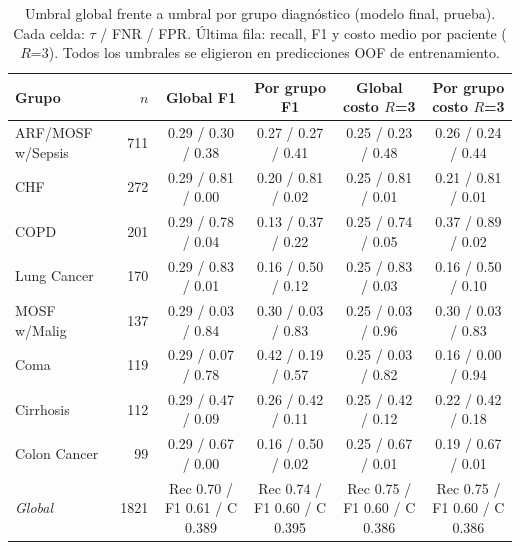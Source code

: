 \begin{table}[!tp]
\centering
\scriptsize
\caption{Umbral global frente a umbral por grupo diagnóstico (modelo final, prueba). Cada celda: $\tau$ / FNR / FPR. Última fila: recall, F1 y costo medio por paciente ($R$=3). Todos los umbrales se eligieron en predicciones OOF de entrenamiento.}
\label{tab:groups}
\setlength{\tabcolsep}{4pt}
\begin{tabular}{lrcccc}
\toprule
Grupo & $n$ & Global F1 & Por grupo F1 & Global costo $R$=3 & Por grupo costo $R$=3 \\
\midrule
ARF/MOSF w/Sepsis & 711 & 0.29 / 0.30 / 0.38 & 0.27 / 0.27 / 0.41 & 0.25 / 0.23 / 0.48 & 0.26 / 0.24 / 0.44 \\
CHF & 272 & 0.29 / 0.81 / 0.00 & 0.20 / 0.81 / 0.02 & 0.25 / 0.81 / 0.01 & 0.21 / 0.81 / 0.01 \\
COPD & 201 & 0.29 / 0.78 / 0.04 & 0.13 / 0.37 / 0.22 & 0.25 / 0.74 / 0.05 & 0.37 / 0.89 / 0.02 \\
Lung Cancer & 170 & 0.29 / 0.83 / 0.01 & 0.16 / 0.50 / 0.12 & 0.25 / 0.83 / 0.03 & 0.16 / 0.50 / 0.10 \\
MOSF w/Malig & 137 & 0.29 / 0.03 / 0.84 & 0.30 / 0.03 / 0.83 & 0.25 / 0.03 / 0.96 & 0.30 / 0.03 / 0.83 \\
Coma & 119 & 0.29 / 0.07 / 0.78 & 0.42 / 0.19 / 0.57 & 0.25 / 0.03 / 0.82 & 0.16 / 0.00 / 0.94 \\
Cirrhosis & 112 & 0.29 / 0.47 / 0.09 & 0.26 / 0.42 / 0.11 & 0.25 / 0.42 / 0.12 & 0.22 / 0.42 / 0.18 \\
Colon Cancer & 99 & 0.29 / 0.67 / 0.00 & 0.16 / 0.50 / 0.02 & 0.25 / 0.67 / 0.01 & 0.19 / 0.67 / 0.01 \\
\textit{Global} & 1821 & Rec 0.70 / F1 0.61 / C 0.389 & Rec 0.74 / F1 0.60 / C 0.395 & Rec 0.75 / F1 0.60 / C 0.386 & Rec 0.75 / F1 0.60 / C 0.386 \\
\bottomrule
\end{tabular}
\end{table}
